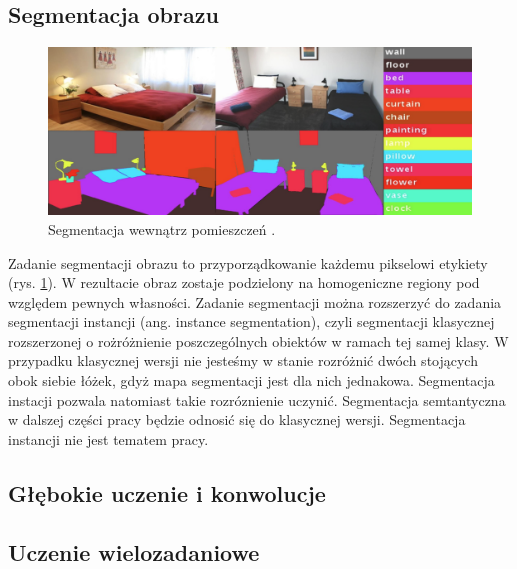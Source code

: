 \subsection{Segmentacja obrazu}
\begin{figure}[ht!]
    \includegraphics[width=\textwidth]{img/segment.png}
    \caption{Segmentacja wewnątrz pomieszczeń \cite{zhang2018context}.}
    \label{fig:segment}
  \end{figure}
Zadanie segmentacji obrazu to przyporządkowanie każdemu pikselowi etykiety (rys. \ref{fig:segment}). W rezultacie obraz zostaje podzielony na homogeniczne regiony pod względem pewnych własności. Zadanie segmentacji można rozszerzyć do zadania segmentacji instancji (ang. instance segmentation), czyli segmentacji klasycznej rozszerzonej o rożróżnienie poszczególnych obiektów w ramach tej samej klasy. W przypadku klasycznej wersji nie jesteśmy w stanie rozróżnić dwóch stojących obok siebie łóżek, gdyż mapa segmentacji jest dla nich jednakowa. Segmentacja instacji pozwala natomiast takie rozróznienie uczynić. Segmentacja semtantyczna w dalszej części pracy będzie odnosić się do klasycznej wersji. Segmentacja instancji nie jest tematem pracy.

\subsection{Głębokie uczenie i konwolucje}
\subsection{Uczenie wielozadaniowe}
